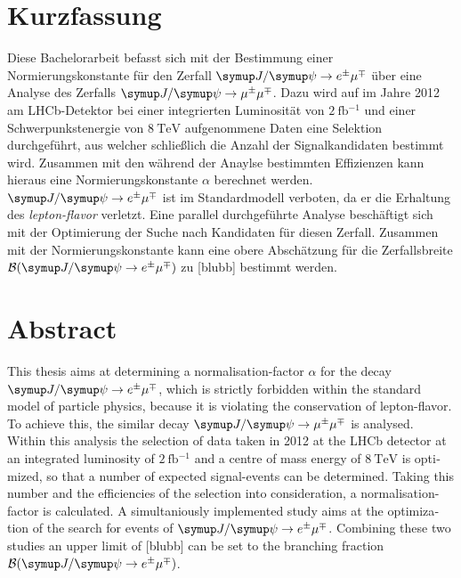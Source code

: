 \thispagestyle{plain}

\section*{Kurzfassung}
Diese Bachelorarbeit befasst sich mit der Bestimmung einer Normierungskonstante für den Zerfall $\signal$ über eine Analyse des Zerfalls $\kontroll$. Dazu wird auf im Jahre 2012 am LHCb-Detektor bei einer integrierten Luminosität von $\SI{2}{\femto\barn^{-1}}$ und einer Schwerpunkstenergie von $\SI{8}{\tera\electronvolt}$ aufgenommene Daten eine Selektion durchgeführt, aus welcher schließlich die Anzahl der Signalkandidaten bestimmt wird. Zusammen mit den während der Anaylse bestimmten Effizienzen kann hieraus eine Normierungskonstante $\alpha$ berechnet werden. $\signal$ ist im Standardmodell verboten, da er die Erhaltung des \textit{lepton-flavor} verletzt. Eine parallel durchgeführte Analyse beschäftigt sich mit der Optimierung der Suche nach Kandidaten für diesen Zerfall. Zusammen mit der Normierungskonstante kann eine obere Abschätzung für die Zerfallsbreite $\mathcal{B}(\signal)$ zu [blubb] bestimmt werden.

\section*{Abstract}
\begin{english}
This thesis aims at determining a normalisation-factor $\alpha$ for the decay $\signal$, which is strictly forbidden within the standard model of particle physics, because it is violating the conservation of lepton-flavor. To achieve this, the similar decay $\kontroll$ is analysed. Within this analysis the selection of data taken in 2012 at the LHCb detector at an integrated luminosity of $\SI{2}{\femto\barn^{-1}}$ and a centre of mass energy of $\SI{8}{\tera\electronvolt}$ is optimized, so that a number of expected signal-events can be determined. Taking this number and the efficiencies of the selection into consideration, a normalisation-factor is calculated. A simultaniously implemented study aims at the optimization of the search for events of $\signal$. Combining these two studies an upper limit of [blubb] can be set to the branching fraction $\mathcal{B}(\signal)$.
\end{english}
